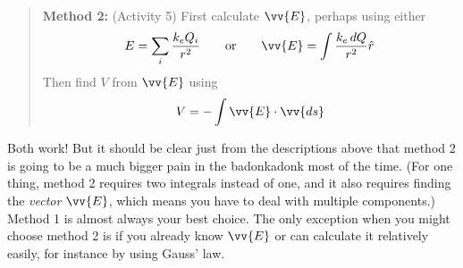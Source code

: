 \begin{quote}
\textbf{Method 2:} (Activity 5) First calculate $\vv{E}$, perhaps using either
$$E = \sum_i{\frac{k_e Q_i}{r^2}}
\qquad  \mathrm{or} \qquad 
\vv{E} = \int{\frac{k_e \, dQ}{r^2}\hat{r}}$$
Then find $V$ from $\vv{E}$ using
$$V = - \int{\vv{E} \cdot \vv{ds}}$$
\end{quote}

Both work!  But it should be clear just from the descriptions above that method 2 is going to be a much bigger pain in the badonkadonk most of the time.  (For one thing, method 2 requires two integrals instead of one, and it also requires finding the \textit{vector} $\vv{E}$, which means you have to deal with multiple components.)  Method 1 is almost always your best choice.  The only exception when you might choose method 2 is if you already know $\vv{E}$ or can calculate it relatively easily, for instance by using Gauss' law.


